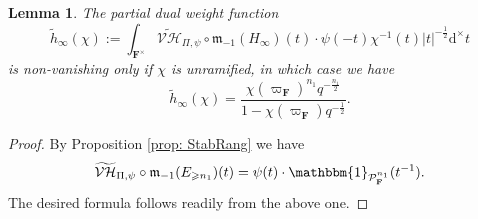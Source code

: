 \documentclass[A4]{amsart}
\def\geq{\geqslant}
\newtheorem{lemma}      [theorem]{Lemma}
\numberwithin{equation}{section} \everymath{\displaystyle}
\newcommand{\id}{\mathbbm{1}}
\newcommand{\ud}{\mathrm{d}}
\newcommand{\F}{\mathbf{F}}
\newcommand{\vP}{\mathcal{P}}
\newcommand{\norm}[1][\cdot]{\lvert #1 \rvert}
\newcommand{\Mult}{\mathfrak{m}}
\newcommand{\VorH}{\mathcal{VH}}
\begin{document}
\begin{lemma} \label{lem: DWtInfty}
	The partial dual weight function
	$$ \widetilde{h}_{\infty}(\chi) := \int_{\F^{\times}} \widetilde{\VorH}_{\Pi,\psi} \circ \Mult_{-1}(H_{\infty})(t) \cdot \psi(-t) \chi^{-1}(t) \norm[t]^{-\frac{1}{2}} \ud^{\times} t $$
is non-vanishing only if $\chi$ is unramified, in which case we have
	$$ \widetilde{h}_{\infty}(\chi) = \frac{\chi(\varpi_{\F})^{n_1} q^{-\frac{n_1}{2}}}{1-\chi(\varpi_{\F})q^{-\frac{1}{2}}}. $$
\end{lemma}
\begin{proof}
	By Proposition \ref{prop: StabRang} we have
	$$ \widetilde{\VorH}_{\Pi,\psi} \circ \Mult_{-1}(E_{\geq n_1})(t) = \psi(t) \cdot \id_{\vP_{\F}^{n_1}}(t^{-1}). $$
	The desired formula follows readily from the above one.
\end{proof}
\end{document}
